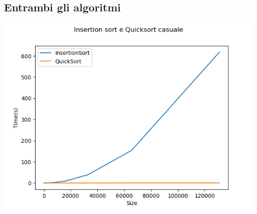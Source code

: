 \documentclass[]{article}
\begin{document}
\subsection{Entrambi gli algoritmi}
\includegraphics[scale=0.8]{InsertionSortEQuicksortCasuale}\\
\end{document}
